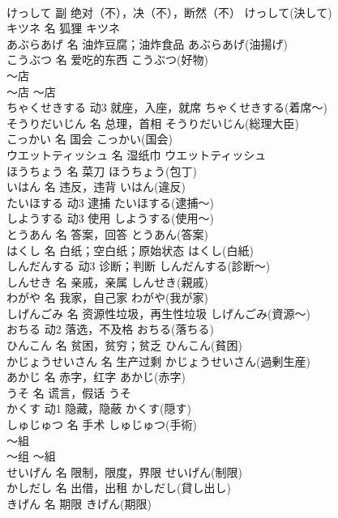 \documentclass[8pt]{extreport}
\begin{document}
\begin{CJK}{UTF8}{min}
\\	けっして	副	绝对（不），决（不），断然（不）	けっして(決して)	
\\	キツネ	名	狐狸	キツネ	
\\	あぶらあげ	名	油炸豆腐；油炸食品	あぶらあげ(油揚げ)	
\\	こうぶつ	名	爱吃的东西	こうぶつ(好物)	
\\	～店	
\\	～店	～店	
\\	ちゃくせきする	动3	就座，入座，就席	ちゃくせきする(着席～)	
\\	そうりだいじん	名	总理，首相	そうりだいじん(総理大臣)	
\\	こっかい	名	国会	こっかい(国会)	
\\	ウエットティッシュ	名	湿纸巾	ウエットティッシュ	
\\	ほうちょう	名	菜刀	ほうちょう(包丁)	
\\	いはん	名	违反，违背	いはん(違反)	
\\	たいほする	动3	逮捕	たいほする(逮捕～)	
\\	しようする	动3	使用	しようする(使用～)	
\\	とうあん	名	答案，回答	とうあん(答案)	
\\	はくし	名	白纸；空白纸；原始状态	はくし(白紙)	
\\	しんだんする	动3	诊断；判断	しんだんする(診断～)	
\\	しんせき	名	亲戚，亲属	しんせき(親戚)	
\\	わがや	名	我家，自己家	わがや(我が家)	
\\	しげんごみ	名	资源性垃圾，再生性垃圾	しげんごみ(資源～)	
\\	おちる	动2	落选，不及格	おちる(落ちる)	
\\	ひんこん	名	贫困，贫穷；贫乏	ひんこん(貧困)	
\\	かじょうせいさん	名	生产过剩	かじょうせいさん(過剰生産)	
\\	あかじ	名	赤字，红字	あかじ(赤字)	
\\	うそ	名	谎言，假话	うそ	
\\	かくす	动1	隐藏，隐蔽	かくす(隠す)	
\\	しゅじゅつ	名	手术	しゅじゅつ(手術)	
\\	～組	
\\	～组	～組	
\\	せいげん	名	限制，限度，界限	せいげん(制限)	
\\	かしだし	名	出借，出租	かしだし(貸し出し)	
\\	きげん	名	期限	きげん(期限)	

\end{CJK}
\end{document}
